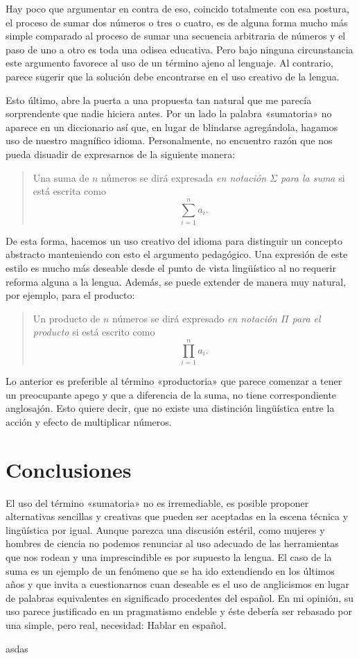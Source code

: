 \documentclass[draft,letter,10pt,notitlepage]{article}
\theoremstyle{definition}
\theoremstyle{remark}
\begin{document}
Hay poco que argumentar en contra de eso, coincido totalmente con
esa postura, el proceso de sumar dos números o tres o cuatro, es
de alguna forma mucho más simple comparado al proceso de sumar una 
secuencia arbitraria de números y el paso de uno a otro es toda una odisea
educativa. Pero bajo ninguna circunstancia este argumento favorece
al uso de un término ajeno al lenguaje. Al contrario, parece
sugerir que la solución debe encontrarse en el uso creativo
de la lengua.

Esto último, abre la puerta a una propuesta tan
natural que me parecía sorprendente que nadie hiciera antes. Por
un lado la palabra «sumatoria» no aparece en un diccionario así que,
en lugar de blindarse agregándola, hagamos uso de nuestro magnífico
idioma. Personalmente, no encuentro razón que nos pueda disuadir de 
expresarnos de la siguiente manera:
\begin{quote}
  Una suma de \( n\) números se dirá expresada  \emph{en notación
  \( \Sigma\) para la suma} si está escrita como
  \[ \sum_{i=1}^n a_i.\]
\end{quote}
De esta forma, hacemos un uso creativo del idioma para distinguir
un concepto abstracto manteniendo con esto el argumento pedagógico.
Una expresión de este estilo es mucho más deseable desde el punto
de vista lingüístico al no requerir reforma alguna a la lengua.
Además, se puede extender de manera muy natural, por ejemplo,
para el producto:
\begin{quote}
  Un producto de \( n\) números se dirá expresado  \emph{en notación
  \( \Pi\) para el producto} si está escrito como
  \[ \prod_{i=1}^n a_i.\]
\end{quote}
Lo anterior es preferible al término «productoria» que parece comenzar
a tener un preocupante apego y que a diferencia de la suma, no tiene
correspondiente anglosajón. Esto quiere decir, que no existe una distinción
lingüística entre la acción y efecto de multiplicar números.

\section{Conclusiones}
El uso del término «sumatoria» no es irremediable,
es posible proponer alternativas sencillas y creativas que pueden ser 
aceptadas en la escena técnica y lingüística por igual. Aunque parezca 
una discusión estéril, como mujeres y hombres de ciencia no podemos 
renunciar al uso adecuado de las herramientas que nos rodean y una 
imprescindible es por supuesto la lengua. El caso de la suma es un ejemplo
de un fenómeno que se ha ido extendiendo en los últimos años y que invita a
cuestionarnos cuan deseable es el uso de anglicismos en lugar de palabras
equivalentes en significado procedentes del español. En mi opinión, 
su uso parece justificado en un pragmatismo endeble y éste debería ser
rebasado por una simple, pero real, necesidad: Hablar en español.

\begin{thebibliography}{}

   asdas 

\end{thebibliography}
\end{document}
